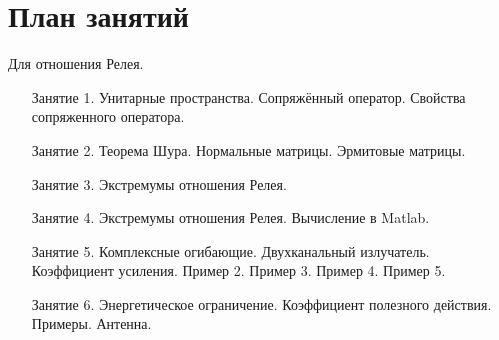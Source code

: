 \chapter{План занятий}

Для отношения Релея.
\begin{itemize}
    \item[Занятие 1.] Унитарные пространства. Сопряжённый оператор. Свойства сопряженного оператора.
    \item[Занятие 2.] Теорема Шура. Нормальные матрицы. Эрмитовые матрицы.
    \item[Занятие 3.] Экстремумы отношения Релея.
    \item[Занятие 4.] Экстремумы отношения Релея. Вычисление в Matlab.
    \item[Занятие 5.] Комплексные огибающие. Двухканальный излучатель. Коэффициент усиления. Пример 2. Пример 3. Пример 4. Пример 5.
    \item[Занятие 6.] Энергетическое ограничение. Коэффициент полезного действия. Примеры. Антенна.
\end{itemize}